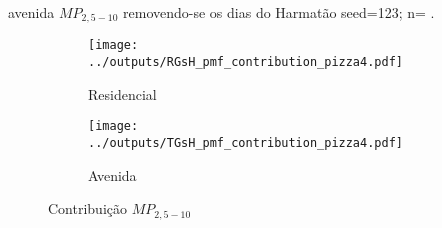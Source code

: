 \begin{table}[H]
  \centering
    
    \caption{avenida $MP_{2,5-10}$ removendo-se os dias do Harmatão 
              seed=123; n= . 
             \label{table:TGsH_profiles4}}
\end{table}


\begin{figure}[H]
  \centering
  \begin{subfigure}[b]{0.45\textwidth}
    \texttt{[image: ../outputs/RGsH\_pmf\_contribution\_pizza4.pdf]}
    \caption{Residencial}
  \end{subfigure}%
  \begin{subfigure}[b]{0.45\textwidth}
    \texttt{[image: ../outputs/TGsH\_pmf\_contribution\_pizza4.pdf]}
    \caption{Avenida}
  \end{subfigure}
  \caption{Contribuição $MP_{2,5-10}$ \label{qqq}}
\end{figure}



%
%
%
